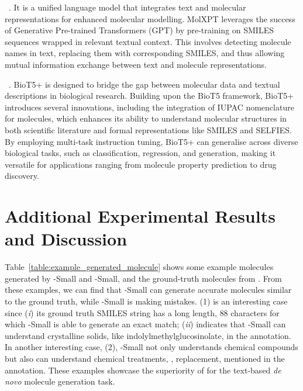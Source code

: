 ~\cite{LZXWXQZL23}. 
It is a unified language model that integrates text and molecular representations for enhanced molecular modelling. 
MolXPT leverages the success of Generative Pre-trained Transformers (GPT) by pre-training on SMILES sequences wrapped in relevant textual context. 
This involves detecting molecule names in text, replacing them with corresponding SMILES, and thus allowing mutual information exchange between text and molecule representations. 

~\cite{PWGLFZXQY24}.
BioT5+ is designed to bridge the gap between molecular data and textual descriptions in biological research. 
Building upon the BioT5 framework, BioT5+ introduces several innovations, including the integration of IUPAC nomenclature for molecules, which enhances its ability to understand molecular structures in both scientific literature and formal representations like SMILES and SELFIES. 
By employing multi-task instruction tuning, BioT5+ can generalise across diverse biological tasks, such as classification, regression, and generation, making it versatile for applications ranging from molecule property prediction to drug discovery. 

\section{Additional Experimental Results and Discussion}
\label{sec:appendix_additional_results_and_discussion}

% 

Table~\ref{table:example_generated_molecule} shows some example molecules generated by \oldmodel-Small and \newmodel-Small, and the ground-truth molecules from \newdataset. 
From these examples, we can find that \newmodel-Small can generate accurate molecules similar to the ground truth, while \oldmodel-Small is making mistakes. 
% 
(1) is an interesting case since (\emph{i}) its ground truth SMILES string has a long length, $88$ characters for which \newmodel-Small is able to generate an exact match; (\emph{ii}) indicates that \newmodel-Small can understand crystalline solids, like indolylmethylglucosinolate, in the annotation. 
% 
In another interesting case, (2), \newmodel-Small not only understands chemical compounds but also can understand chemical treatments, \eg, replacement, mentioned in the annotation. 
% 
These examples showcase the superiority of \newmodel for the text-based \emph{de novo} molecule generation task.

